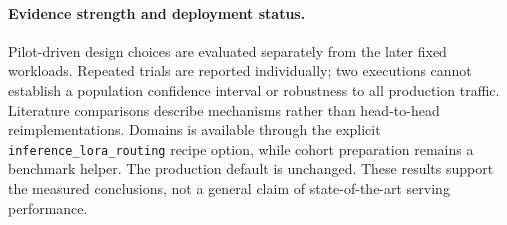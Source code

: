 \paragraph{Evidence strength and deployment status.}
Pilot-driven design choices are evaluated separately from the later fixed
workloads. Repeated trials are reported individually; two executions cannot
establish a population confidence interval or robustness to all production
traffic. Literature comparisons describe mechanisms rather than head-to-head
reimplementations. Domains is available through the explicit
\texttt{inference\_lora\_routing} recipe option, while cohort preparation remains
a benchmark helper. The production default is unchanged. These results support
the measured conclusions, not a general claim of state-of-the-art serving
performance.
